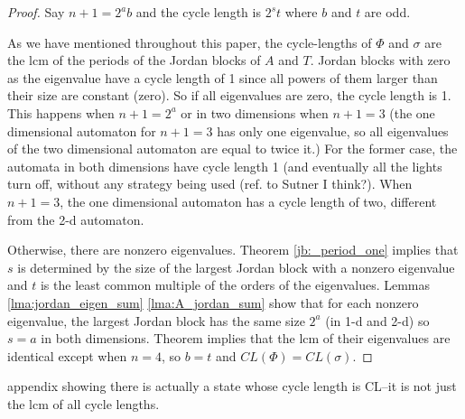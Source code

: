 \documentclass{elsarticle}
\theoremstyle{definition}
\begin{document}
\begin{proof}
Say $n+1=2^ab$ and the cycle length is $2^st$ where $b$ and $t$ are odd.

As we have mentioned throughout this paper, the cycle-lengths of $\Phi$ and $\sigma$ are the lcm of the periods of the Jordan blocks of $A$ and $T$. Jordan blocks with zero as the eigenvalue have a cycle length of 1 since all powers of them larger than their size are constant (zero).  So if all eigenvalues are zero, the cycle length is 1. This happens when $n+1=2^a$ or in two dimensions when $n+1=3$ (the one dimensional automaton for $n+1=3$ has only one eigenvalue, so all eigenvalues of the two dimensional automaton are equal to twice it.)  For the former case, the automata in both dimensions have cycle length 1 (and eventually all the lights turn off, without any strategy being used (ref. to Sutner I think?). When $n+1=3$, the one dimensional automaton has a cycle length of two, different from the 2-d automaton.

Otherwise, there are nonzero eigenvalues. Theorem \ref{jb:_period_one} implies that $s$ is determined by the size of the largest Jordan block with a nonzero eigenvalue and $t$ is the least common multiple of the orders of the eigenvalues. 
Lemmas \ref{lma:jordan_eigen_sum} \ref{lma:A_jordan_sum} show that for each nonzero eigenvalue, the largest Jordan block has the same size $2^a$ (in 1-d and 2-d) so $s=a$ in both dimensions.
Theorem \label{thm:eig_lcm_equal} implies that the lcm of their eigenvalues are identical except when $n=4$, so $b=t$ and
$CL(\Phi)=CL(\sigma)$.
\end{proof}

appendix showing there is actually a state whose cycle length is CL--it is not just the lcm of all cycle lengths.


\end{document}
